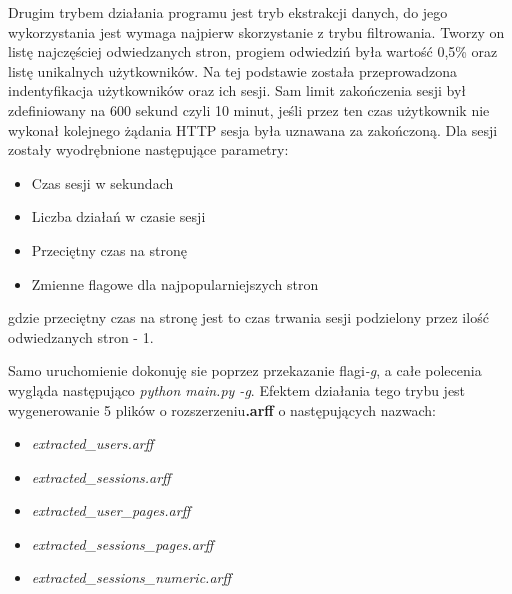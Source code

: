 \documentclass{classrep}
\begin{document}
{{            Drugim trybem działania programu jest tryb ekstrakcji danych, do jego
            wykorzystania jest wymaga najpierw skorzystanie z trybu filtrowania. Tworzy on
            listę najczęściej odwiedzanych stron, progiem odwiedziń była wartość 0,5\%
            oraz listę unikalnych użytkowników. Na tej podstawie została przeprowadzona
            indentyfikacja użytkowników oraz ich sesji. Sam limit zakończenia sesji
            był zdefiniowany na 600 sekund czyli 10 minut, jeśli przez ten czas
            użytkownik nie wykonał kolejnego żądania HTTP sesja była uznawana za
            zakończoną. Dla sesji zostały wyodrębnione następujące parametry:
            \begin{itemize}
                \item Czas sesji w sekundach
                \item Liczba działań w czasie sesji
                \item Przeciętny czas na stronę
                \item Zmienne flagowe dla najpopularniejszych stron
            \end{itemize}
            gdzie przeciętny czas na stronę jest to czas trwania sesji podzielony przez
            ilość odwiedzanych stron - 1.

            Samo uruchomienie dokonuję sie poprzez przekazanie flagi\textit{-g}, a całe
            polecenia wygląda następująco \textit{python main.py -g}. Efektem działania
            tego trybu jest wygenerowanie 5 plików o rozszerzeniu\textbf{.arff} o
            następujących nazwach:
            \begin{itemize}
                \item \textit{extracted\_users.arff}
                \item \textit{extracted\_sessions.arff}
                \item \textit{extracted\_user\_pages.arff}
                \item \textit{extracted\_sessions\_pages.arff}
                \item \textit{extracted\_sessions\_numeric.arff}
            \end{itemize}
        }
    }
\end{document}
